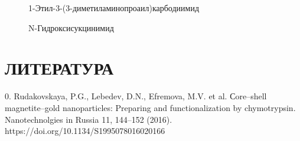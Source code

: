 \documentclass[10pt, a4paper]{article}
\begin{document}
\begin{figure}[ht!]
  \centering 
  \captionsetup{labelformat=empty}
  \caption{1-Этил-3-(3-диметиламинопроаил)карбодиимид}
\end{figure}

\begin{figure}[ht!]
  \centering 
  \captionsetup{labelformat=empty}
  \caption{N-Гидроксисукцинимид}
\end{figure}

\newpage

\section*{ЛИТЕРАТУРА}
0. Rudakovskaya, P.G., Lebedev, D.N., Efremova, M.V. et al. Сore–shell magnetite–gold nanoparticles: Preparing and functionalization by chymotrypsin. \\
Nanotechnolgies in Russia 11, 144–152 (2016). https://doi.org/10.1134/S1995078016020166
\end{document}
